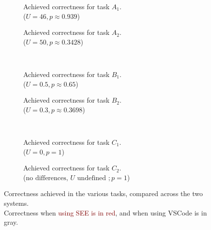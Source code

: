 \documentclass[../thesis]{subfiles}
\begin{document}
\begin{figure}
	\begin{subfigure}[T]{0.5\textwidth}
		\caption{Achieved correctness for task $A_1$.\\
			($U = 46, p \approx 0.939$)
			\label{fig:a1c}}
	\end{subfigure}\hfill
	\begin{subfigure}[T]{0.5\textwidth}
		\caption{Achieved correctness for task $A_2$.\\
			($U = 50, p \approx 0.3428$)\label{fig:a2c}}
	\end{subfigure}\\
	\begin{subfigure}[T]{0.5\textwidth}
		\caption{Achieved correctness for task $B_1$.\\
			($U = 0.5, p \approx 0.65$)\label{fig:b1c}}
	\end{subfigure}\hfill
	\begin{subfigure}[T]{0.5\textwidth}
		\caption{Achieved correctness for task $B_2$.\\
			($U = 0.3, p \approx 0.3698$)\label{fig:b2c}}
	\end{subfigure}\\
	\begin{subfigure}[T]{0.5\textwidth}
		\caption{Achieved correctness for task $C_1$.\\
			($U = 0, p = 1$)\label{fig:c1c}}
	\end{subfigure}\hfill
	\begin{subfigure}[T]{0.5\textwidth}
		\caption{Achieved correctness for task $C_2$.\\
			($\text{no differences, } U \text{ undefined }; p = 1$)\label{fig:c2c}}
	\end{subfigure}
	\caption{Correctness achieved in the various tasks, compared across the two systems.\\
		Correctness when \textcolor{Maroon}{using SEE is in red}, and when \textcolor{Gray!50!black}{using VSCode is in gray}.}\label{fig:correctness}
\end{figure}
\end{document}
